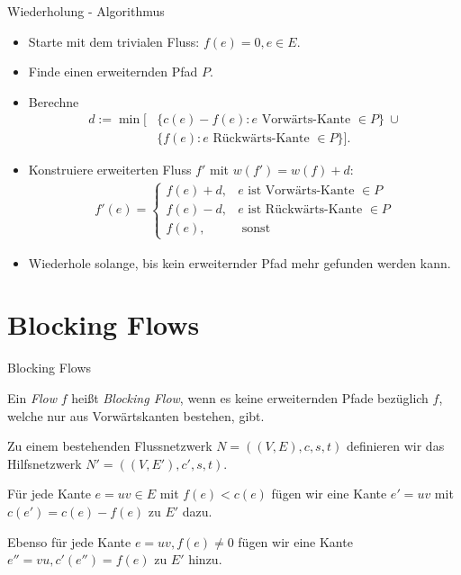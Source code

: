 \documentclass[aspectratio=169]{beamer}
\begin{document}
\begin{frame}{Wiederholung - Algorithmus}

  \begin{algorithmus*}
    \begin{itemize}
      \item Starte mit dem trivialen Fluss: $f(e) = 0 , e \in E$.
      \item Finde einen erweiternden Pfad $P$.
      \item Berechne
      \begin{align*}
        d := \min[&\{c(e) - f(e): e \text{ Vorwärts-Kante } \in P\} \ \cup \\
        &\{f(e): e \text{ Rückwärts-Kante } \in P\} ].
      \end{align*}
      \item Konstruiere erweiterten Fluss $f'$ mit $w(f') = w(f) + d$:
      \begin{align*}
        f'(e) = \begin{cases}
          f(e) + d, & e \text{ ist Vorwärts-Kante } \in P \\
          f(e) - d, & e \text{ ist Rückwärts-Kante } \in P\\
          f(e), & \text{ sonst}
        \end{cases}
      \end{align*}
      \item Wiederhole solange, bis kein erweiternder Pfad mehr gefunden werden kann.
    \end{itemize}
  \end{algorithmus*}

\end{frame}

\section{Blocking Flows}

\begin{frame}{Blocking Flows}

\begin{definition}
  Ein \textit{Flow} $f$ heißt \textit{Blocking Flow}, wenn
  es keine erweiternden Pfade bezüglich $f$, welche nur aus
  Vorwärtskanten bestehen, gibt.
\end{definition}

\begin{definition}
  Zu einem bestehenden Flussnetzwerk $N = ((V,E), c, s, t)$
  definieren wir das Hilfsnetzwerk $N' = ((V,E'), c', s, t)$.


  Für jede Kante $e = uv \in E$ mit $f(e) < c(e)$
  fügen wir eine Kante $e' = uv$ mit $c(e') = c(e) - f(e)$ zu $E'$ dazu.


  Ebenso für jede Kante $e = uv, f(e) \neq 0$ fügen wir eine Kante
  $e'' = vu, c'(e'') = f(e)$ zu $E'$ hinzu.
\end{definition}

\end{frame}
\end{document}
